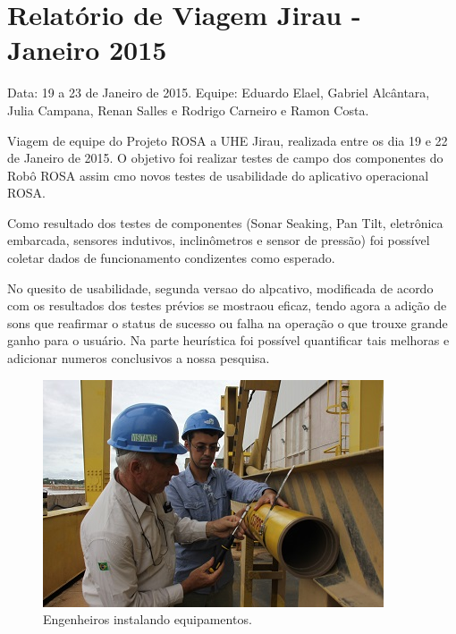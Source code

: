 \section{Relatório de Viagem Jirau - Janeiro 2015}
Data: 19 a 23 de Janeiro de 2015.
Equipe: Eduardo Elael, Gabriel Alcântara, Julia Campana, Renan Salles e Rodrigo Carneiro e Ramon Costa.

Viagem de equipe do Projeto ROSA a UHE Jirau, realizada entre
os dia 19 e 22 de Janeiro de 2015. O objetivo foi realizar testes de campo dos
componentes do Robô ROSA assim cmo novos testes de usabilidade do aplicativo
operacional ROSA.

Como resultado dos testes de componentes (Sonar Seaking, Pan Tilt, eletrônica
embarcada, sensores indutivos, inclinômetros e sensor de pressão) foi possível
coletar dados de funcionamento condizentes como esperado.

No quesito de usabilidade, segunda versao do alpcativo, modificada de acordo com
os resultados dos testes prévios se mostraou eficaz, tendo agora a adição de
sons que reafirmar o status de sucesso ou falha na operação o que trouxe grande
ganho para o usuário. Na parte heurística foi possível quantificar tais
melhoras e adicionar numeros conclusivos a nossa pesquisa.



\begin{figure}[h!]
\centering
  \includegraphics[width=1\linewidth]{Fotos/Janeiro2015/5.jpg}
  \caption{Engenheiros instalando equipamentos.}
  \label{nov20131}
\end{figure}


